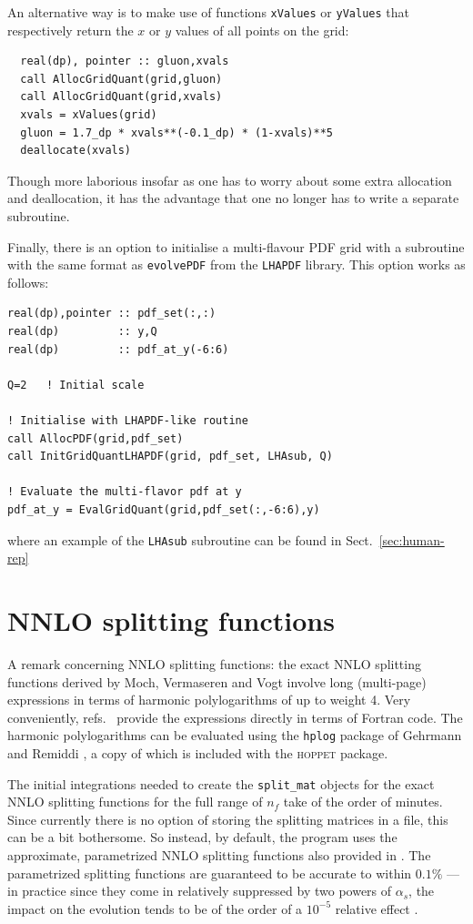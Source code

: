\documentclass[12pt]{article}
\newcommand{\as}{\alpha_s}
\newcommand{\hoppet}{\textsc{hoppet}\xspace}
\newcommand{\ttt}[1]{\texttt{#1}}
\begin{document}
An alternative way is to
make use of functions \texttt{xValues} or \texttt{yValues} that
respectively return the $x$ or $y$ values of all points on the grid:
\begin{lstlisting}
  real(dp), pointer :: gluon,xvals
  call AllocGridQuant(grid,gluon)
  call AllocGridQuant(grid,xvals)
  xvals = xValues(grid)
  gluon = 1.7_dp * xvals**(-0.1_dp) * (1-xvals)**5 
  deallocate(xvals)
\end{lstlisting}
Though more laborious insofar as one has to worry about some extra
allocation and deallocation, it has the advantage that one no longer
has to write a separate subroutine.

Finally, there is an option to initialise a multi-flavour
PDF grid with a subroutine with the same format as
\ttt{evolvePDF} from the \ttt{LHAPDF} library. This
option works as follows:

\begin{lstlisting}
real(dp),pointer :: pdf_set(:,:)
real(dp)         :: y,Q
real(dp)         :: pdf_at_y(-6:6)

Q=2   ! Initial scale

! Initialise with LHAPDF-like routine
call AllocPDF(grid,pdf_set)
call InitGridQuantLHAPDF(grid, pdf_set, LHAsub, Q)

! Evaluate the multi-flavor pdf at y
pdf_at_y = EvalGridQuant(grid,pdf_set(:,-6:6),y)

\end{lstlisting}
where an example of  the \ttt{LHAsub} subroutine can be found in
Sect.~\ref{sec:human-rep}

\section{NNLO splitting functions}
\label{sect:nnlo}
A remark concerning NNLO splitting functions: the exact NNLO splitting
functions derived by Moch, Vermaseren and Vogt
\cite{NNLO-NS,NNLO-singlet} involve long (multi-page) expressions in
terms of harmonic polylogarithms of up to weight 4. Very conveniently,
refs.~\cite{NNLO-NS,NNLO-singlet} provide the expressions directly in
terms of Fortran code.
%
The harmonic polylogarithms can be evaluated using the \ttt{hplog}
package of Gehrmann and Remiddi \cite{FortranPolyLog}, a copy of which
is included with the \hoppet package. 

The initial integrations needed to create the \ttt{split\_mat} objects
for the exact NNLO splitting functions for the full range of $n_f$
take of the order of minutes.  Since currently there is no option of
storing the splitting matrices in a file, this can be a bit
bothersome. So instead, by default, the program uses the approximate,
parametrized NNLO splitting functions also provided in
\cite{NNLO-NS,NNLO-singlet}. The parametrized splitting functions are
guaranteed to be accurate to within $0.1\%$ --- in practice since they
come in relatively suppressed by two powers of $\as$, the impact on
the evolution tends to be of the order of a  $10^{-5}$ relative effect
\cite{Benchmarks}.
\end{document}
